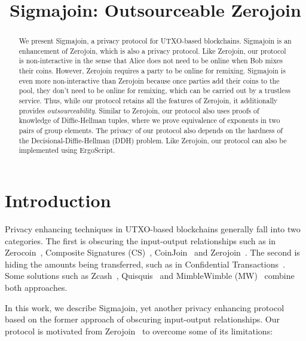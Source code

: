 \documentclass[runningheads]{llncs}
\newcommand{\ergoscript}{ErgoScript\xspace}
\newcommand{\zerocoin}{Zerocoin\xspace}
\newcommand{\zerojoin}{Zerojoin\xspace}
\begin{document}
\newcommand{\algname}{Sigmajoin\xspace}
\title{\algname: Outsourceable \zerojoin}

\maketitle

\begin{abstract}

We present \algname, a privacy protocol for UTXO-based
blockchains. \algname is an enhancement of \zerojoin, which is also a privacy protocol.
Like \zerojoin, our protocol is non-interactive in the sense that Alice does not need to be online when Bob mixes their coins.
However, \zerojoin requires a party to be online for remixing. \algname is even more non-interactive than \zerojoin because
once parties add  their coins to the pool, they don't need to be online for remixing, which can be carried out by a trustless service.
Thus, while our protocol retains all the features of \zerojoin, it additionally provides {\em outsourceability}. Similar to \zerojoin, our protocol also uses proofs of knowledge of Diffie-Hellman tuples, where we prove equivalence of exponents in two pairs of group elements. The privacy of our protocol also depends on the hardness of the Decisional-Diffie-Hellman (DDH) problem. Like \zerojoin, our protocol can also be implemented using \ergoscript.
\end{abstract}

\section{Introduction}
\label{intro}


Privacy enhancing techniques in UTXO-based blockchains generally fall into two categories. The first is obscuring the input-output relationships such as in \zerocoin~\cite{zerocoin}, Composite Signatures (CS)~\cite{composite}, CoinJoin~\cite{coinjoin} and \zerojoin~\cite{zerojoin}. The second is hiding the amounts being transferred, such as in Confidential Transactions~\cite{ct}. Some solutions such as Zcash~\cite{zcash,zcash1}, Quisquis~\cite{quisquis} and MimbleWimble (MW)~\cite{mw} combine both approaches.

In this work, we describe \algname, yet another privacy enhancing protocol based on the former approach of obscuring input-output relationships. Our protocol is motivated from \zerojoin~\cite{zerojoin} to overcome some of its limitations:
\end{document}

